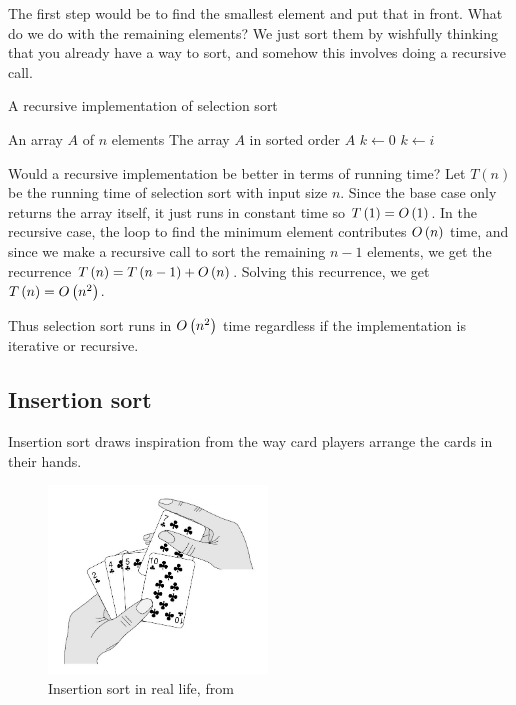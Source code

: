 The first step would be to find the smallest element and put that in front. What do we do with the remaining elements? We just sort them by wishfully thinking that you already have a way to sort, and somehow this involves doing a recursive call. 

\begin{algorithm}[H]
    \caption{A recursive implementation of selection sort}
    \begin{algorithmic}[1]
        \Require An array $A$ of $n$ elements
        \Ensure The array $A$ in sorted order
                \Return $A$
            \EndIf
            \State $k \gets 0$
                    \State $k \gets i$
                \EndIf
            \EndFor
            \State {}
            \Return {}
        \EndFunction
    \end{algorithmic}
\end{algorithm}

Would a recursive implementation be better in terms of running time? Let $T\left(n\right)$ be the running time of selection sort with input size $n$. Since the base case only returns the array itself, it just runs in constant time so $T\left(1\right) = O\left(1 \right)$. In the recursive case, the loop to find the minimum element contributes $O\left(n \right)$ time, and since we make a recursive call to sort the remaining $n-1$ elements, we get the recurrence $T\left(n\right) = T\left(n-1\right) + O\left(n \right)$. Solving this recurrence, we get $T\left(n\right) = O\left(n^2 \right)$. 

Thus selection sort runs in $O\left(n^2 \right)$ time regardless if the implementation is iterative or recursive.

\subsection{Insertion sort}
Insertion sort draws inspiration from the way card players arrange the cards in their hands.

\begin{figure}[H]
    \centering
    \includegraphics[height=5cm]{figures/insertionsort.jpg}
    \caption{Insertion sort in real life, from \cite{cormen_introduction_2009}}
\end{figure}

